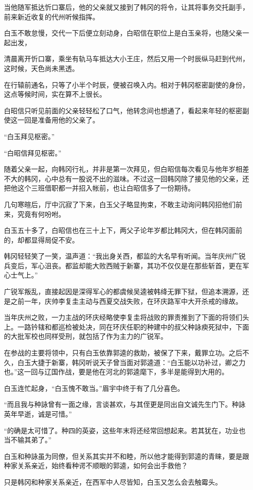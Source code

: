 当他随军抵达忻口寨后，他的父亲就又接到了韩冈的将令，让其将事务交托副手，前来新近收复的代州听候指挥。

白玉不敢怠慢，交代一下后便立刻动身，白昭信在职位上是白玉亲将，也随父亲一起出发，

清晨离开忻口寨，乘坐有轨马车抵达大小王庄，然后又用一个时辰纵马赶到代州，这时候，天色尚未黑透。

在行辕前通名，只等了小半个时辰，便被召唤入内。相对于韩冈枢密副使的身份，这点等候时间，实在算不上很长。

白昭信只听见前面的父亲轻轻松了口气，他转念间也想通了，看起来年轻的枢密副使这一回是准备用他的父亲了。

“白玉拜见枢密。”

“白昭信拜见枢密。”

随着父亲一起，向韩冈行礼，并非是第一次拜见，但白昭信每次看见与他年岁相差不大的韩冈，心中总有一股说不出的滋味。不过这一回韩冈除了接见他的父亲，还把他这个三班借职都一并招入帐前，也让白昭信多了一份期待。

几句寒暄后，厅中沉寂了下来，白玉父子略显拘束，不敢主动询问韩冈招他们前来，究竟有何吩咐。

白玉五十多了，白昭信也在三十上下，两父子论年岁都比韩冈大，但在韩冈面前的，却都显得局促不安。

韩冈轻轻笑了一笑，温声道：“我出身关西，都监的大名早有听闻。当年庆州广锐兵变后，军心沮丧。都监却能大败西贼于新寨，其功不仅仅是在那些斩首，更在军心士气上。”

广锐军叛乱，直接起因是深得军心的都虞候吴逵被韩绛无罪下狱，但追本溯源，还是之前一年，庆帅李复圭主动与西夏交战失败，在环庆路军中大开杀戒的缘故。

当年庆州之败，一力主战的环庆经略使李复圭将战败的罪责推到了下面的将领们头上。一路钤辖和都巡检被处决，同在环庆任职的种建中的叔父种詠瘐死狱中，下面的大批军校也同样受刑，就包括了作为主力的广锐军。

在参战的主要将领中，只有白玉依靠郭逵的救助，被保了下来，戴罪立功。之后不久，白玉大捷于新寨，韩冈听说天子曾当面对郭逵道：“白玉能以功补过，卿之力也。”这一回与辽国作战，要是他在河北的郭逵麾下，多半是能得到大用的。

白玉连忙起身，“白玉愧不敢当。”眉宇中终于有了几分喜色。

“而且我与种詠曾有一面之缘，言谈甚欢，与其侄更是同出自文诚先生门下。种詠英年早逝，诚是可惜。”

“的确是太可惜了。种四的英姿，这些年末将还经常回想起来。若其犹在，功业也当不输其弟了。”

白玉和种詠虽为同僚，但关系其实并不和睦，所以他才能得到郭逵的青睐，要是跟种家关系亲近，始终看种谔不顺眼的郭逵，如何会出手救他？

只是韩冈和种家关系亲近，在西军中人尽皆知，白玉又怎么会去触霉头。
